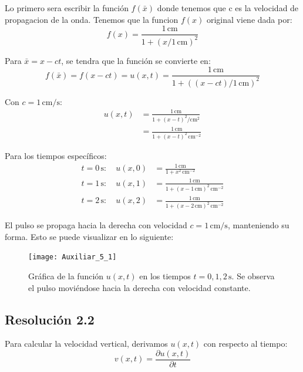 \documentclass[
  11pt,
  letterpaper,
   addpoints,
  ]{exam}
\begin{document}
\begin{questions}
\begin{solution}
Lo primero sera escribir la función $f(\bar{x})$ donde tenemos que c es la velocidad de propagacion de la onda. Tenemos que la funcion $f(x)$ original viene dada por:
  \begin{equation}
    f(x) = \frac{1\,\mathrm{cm}}{1 + \left(x/1\,\mathrm{cm}\right)^2}
  \end{equation}

  Para $\bar{x} = x - ct$, se tendra que la función se convierte en:
  \begin{equation}
    f(\bar{x}) = f(x-ct) = u(x,t) = \frac{1\,\mathrm{cm}}{1 + \left((x-ct)/1\,\mathrm{cm}\right)^2}
  \end{equation}
  
  Con $c = 1\,\mathrm{cm/s}$:
  \begin{align}
    u(x,t) &= \frac{1\,\mathrm{cm}}{1 + (x-t)^2/\mathrm{cm}^2} \\
    &= \frac{1\,\mathrm{cm}}{1 + (x-t)^2\,\mathrm{cm}^{-2}}
  \end{align}
  
  Para los tiempos específicos:
  \begin{align}
    t = 0\,\mathrm{s}: \quad u(x,0) &= \frac{1\,\mathrm{cm}}{1 + x^2\,\mathrm{cm}^{-2}} \\
    t = 1\,\mathrm{s}: \quad u(x,1) &= \frac{1\,\mathrm{cm}}{1 + (x-1\,\mathrm{cm})^2\,\mathrm{cm}^{-2}} \\
    t = 2\,\mathrm{s}: \quad u(x,2) &= \frac{1\,\mathrm{cm}}{1 + (x-2\,\mathrm{cm})^2\,\mathrm{cm}^{-2}}
  \end{align}
  
  El pulso se propaga hacia la derecha con velocidad $c = 1\,\mathrm{cm/s}$, manteniendo su forma. Esto se puede visualizar en lo siguiente:
  \begin{figure}[H]
    \centering
    \texttt{[image: Auxiliar\_5\_1]}
    \caption{Gráfica de la función $u(x,t)$ en los tiempos $t = 0, 1, 2\,\mathrm{s}$. Se observa el pulso moviéndose hacia la derecha con velocidad constante.}
  \end{figure}
  
  \subsection*{Resolución 2.2}
  
  Para calcular la velocidad vertical, derivamos $u(x,t)$ con respecto al tiempo:
  \begin{equation}
    v(x,t) = \frac{\partial u(x,t)}{\partial t}
  \end{equation}
  

\end{solution}
\end{questions}
\end{document}
